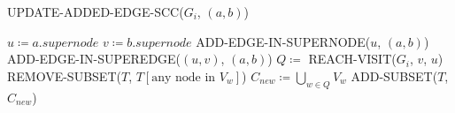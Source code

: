 \begin{algorithm}[H]
    \caption{UPDATE-ADDED-EDGE-SCC($G_i$, $(a, b)$)}\label{alg:add-edge-scc}
    \begin{algorithmic}[1]
        \State $u \coloneqq a.supernode$
        \State $v \coloneqq b.supernode$
            \State ADD-EDGE-IN-SUPERNODE($u$, $(a, b)$)
        \Else
            \State ADD-EDGE-IN-SUPEREDGE($(u, v)$, $(a, b)$)
                \State $Q \coloneqq$ REACH-VISIT($G_i$, $v$, $u$)
                            \State REMOVE-SUBSET($T$, $T[\text{any node in } V_w]$)
                        \EndFor
                        \State $C_{new} \coloneqq \bigcup_{w \in Q} V_w$
                        \State ADD-SUBSET($T$, $C_{new}$)
                    \EndIf
            \EndIf
        \EndIf
    \end{algorithmic}
\end{algorithm}